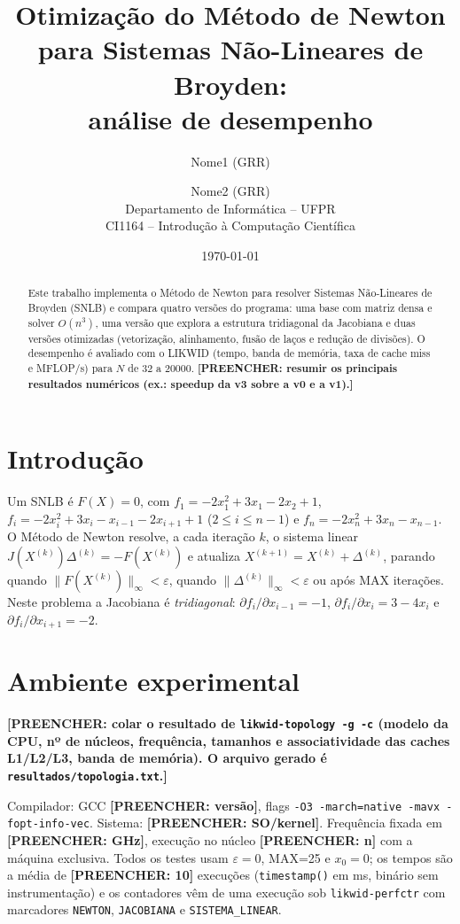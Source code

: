 \documentclass[10pt,a4paper]{article}
\title{Otimização do Método de Newton para Sistemas Não-Lineares de Broyden:\\ análise de desempenho}
\author{Nome1 (GRR) \and Nome2 (GRR)\\
Departamento de Informática -- UFPR\\ CI1164 -- Introdução à Computação Científica}
\date{\today}
\newcommand{\preencher}[1]{\textbf{[PREENCHER: #1]}}
\begin{document}
\maketitle

\begin{abstract}
Este trabalho implementa o Método de Newton para resolver Sistemas Não-Lineares de Broyden (SNLB)
e compara quatro versões do programa: uma base com matriz densa e solver $O(n^3)$, uma versão que explora a
estrutura tridiagonal da Jacobiana e duas versões otimizadas (vetorização, alinhamento, fusão de laços e
redução de divisões). O desempenho é avaliado com o LIKWID (tempo, banda de memória, taxa de cache miss
e MFLOP/s) para $N$ de 32 a 20000. \preencher{resumir os principais resultados numéricos (ex.: speedup da v3 sobre a v0 e a v1).}
\end{abstract}

\section{Introdução}
Um SNLB é $F(X)=0$, com $f_1=-2x_1^2+3x_1-2x_2+1$, $f_i=-2x_i^2+3x_i-x_{i-1}-2x_{i+1}+1$ ($2\le i\le n-1$)
e $f_n=-2x_n^2+3x_n-x_{n-1}$. O Método de Newton resolve, a cada iteração $k$, o sistema linear
$J(X^{(k)})\Delta^{(k)}=-F(X^{(k)})$ e atualiza $X^{(k+1)}=X^{(k)}+\Delta^{(k)}$, parando quando
$\|F(X^{(k)})\|_\infty<\varepsilon$, quando $\|\Delta^{(k)}\|_\infty<\varepsilon$ ou após MAX iterações.
Neste problema a Jacobiana é \emph{tridiagonal}: $\partial f_i/\partial x_{i-1}=-1$,
$\partial f_i/\partial x_i=3-4x_i$ e $\partial f_i/\partial x_{i+1}=-2$.

\section{Ambiente experimental}
\preencher{colar o resultado de \texttt{likwid-topology -g -c} (modelo da CPU, nº de núcleos, frequência, tamanhos e associatividade das caches L1/L2/L3, banda de memória). O arquivo gerado é \texttt{resultados/topologia.txt}.}
\par\smallskip
Compilador: GCC \preencher{versão}, flags \texttt{-O3 -march=native -mavx -fopt-info-vec}. Sistema: \preencher{SO/kernel}.
Frequência fixada em \preencher{GHz}, execução no núcleo \preencher{n} com a máquina exclusiva.
Todos os testes usam $\varepsilon=0$, MAX=25 e $x_0=0$; os tempos são a média de \preencher{10} execuções
(\texttt{timestamp()} em ms, binário sem instrumentação) e os contadores vêm de uma execução sob \texttt{likwid-perfctr}
com marcadores \texttt{NEWTON}, \texttt{JACOBIANA} e \texttt{SISTEMA\_LINEAR}.
\end{document}
